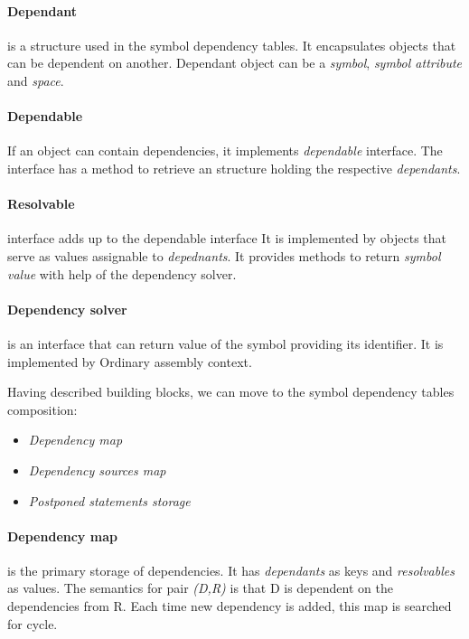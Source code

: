 \paragraph*{Dependant} is a structure used in the symbol dependency tables. It encapsulates objects that can be dependent on another. Dependant object can be a \emph{symbol}, \emph{symbol attribute} and \emph{space}.

\paragraph*{Dependable} If an object can contain dependencies, it implements \emph{dependable} interface. The interface has a method to retrieve an structure holding the respective \emph{dependants}. 

\paragraph*{Resolvable} interface adds up to the dependable interface It is implemented by objects that serve as values assignable to \emph{depednants}. It provides methods to return \emph{symbol value} with help of the dependency solver. 

\paragraph*{Dependency solver} is an interface that can return value of the symbol providing its identifier. It is implemented by Ordinary assembly context.

\vspace{0.5cm}

Having described building blocks, we can move to the symbol dependency tables composition:
\begin{itemize}
	\item \emph{Dependency map}
	\item \emph{Dependency sources map}
	\item \emph{Postponed statements storage}
\end{itemize}

\paragraph*{Dependency map} is the primary storage of dependencies. It has \emph{dependants} as keys and \emph{resolvables} as values. The semantics for pair \emph{(D,R)} is that D is dependent on the dependencies from R. Each time new dependency is added, this map is searched for cycle.

